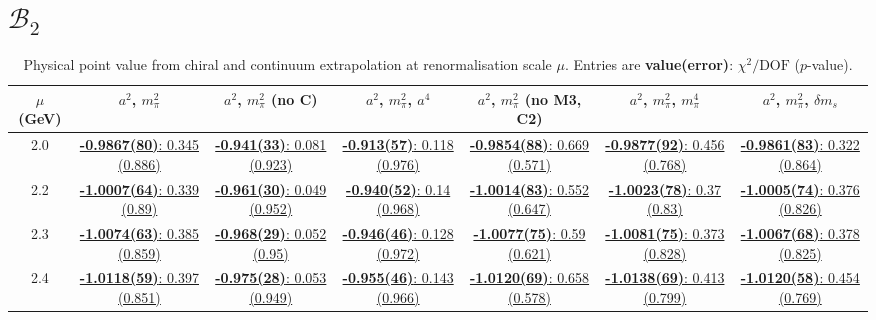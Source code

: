 \documentclass[12pt]{extarticle}
\begin{document}
\section{$\mathcal{B}_2$}
\begin{table}[h!]
\begin{center}
\begin{tabular}{|c|c|c|c|c|c|c|}
\hline
$\mu$ (GeV) & $a^2$, $m_\pi^2$& $a^2$, $m_\pi^2$ (no C)& $a^2$, $m_\pi^2$, $a^4$& $a^2$, $m_\pi^2$ (no M3, C2)& $a^2$, $m_\pi^2$, $m_\pi^4$& $a^2$, $m_\pi^2$, $\delta m_s$\\
\hline
2.0& \hyperlink{VVmAA/NPR/bag_a2m2_20.pdf.1}{\textbf{-0.9867(80)}: 0.345 (0.886)} & \hyperlink{VVmAA/NPR/bag_a2m2noC_20.pdf.1}{\textbf{-0.941(33)}: 0.081 (0.923)} & \hyperlink{VVmAA/NPR/bag_a2a4m2_20.pdf.1}{\textbf{-0.913(57)}: 0.118 (0.976)} & \hyperlink{VVmAA/NPR/bag_a2m2mcut_20.pdf.1}{\textbf{-0.9854(88)}: 0.669 (0.571)} & \hyperlink{VVmAA/NPR/bag_a2m2m4_20.pdf.1}{\textbf{-0.9877(92)}: 0.456 (0.768)} & \hyperlink{VVmAA/NPR/bag_a2m2delm_20.pdf.1}{\textbf{-0.9861(83)}: 0.322 (0.864)}\\
2.2& \hyperlink{VVmAA/NPR/bag_a2m2_22.pdf.1}{\textbf{-1.0007(64)}: 0.339 (0.89)} & \hyperlink{VVmAA/NPR/bag_a2m2noC_22.pdf.1}{\textbf{-0.961(30)}: 0.049 (0.952)} & \hyperlink{VVmAA/NPR/bag_a2a4m2_22.pdf.1}{\textbf{-0.940(52)}: 0.14 (0.968)} & \hyperlink{VVmAA/NPR/bag_a2m2mcut_22.pdf.1}{\textbf{-1.0014(83)}: 0.552 (0.647)} & \hyperlink{VVmAA/NPR/bag_a2m2m4_22.pdf.1}{\textbf{-1.0023(78)}: 0.37 (0.83)} & \hyperlink{VVmAA/NPR/bag_a2m2delm_22.pdf.1}{\textbf{-1.0005(74)}: 0.376 (0.826)}\\
2.3& \hyperlink{VVmAA/NPR/bag_a2m2_23.pdf.1}{\textbf{-1.0074(63)}: 0.385 (0.859)} & \hyperlink{VVmAA/NPR/bag_a2m2noC_23.pdf.1}{\textbf{-0.968(29)}: 0.052 (0.95)} & \hyperlink{VVmAA/NPR/bag_a2a4m2_23.pdf.1}{\textbf{-0.946(46)}: 0.128 (0.972)} & \hyperlink{VVmAA/NPR/bag_a2m2mcut_23.pdf.1}{\textbf{-1.0077(75)}: 0.59 (0.621)} & \hyperlink{VVmAA/NPR/bag_a2m2m4_23.pdf.1}{\textbf{-1.0081(75)}: 0.373 (0.828)} & \hyperlink{VVmAA/NPR/bag_a2m2delm_23.pdf.1}{\textbf{-1.0067(68)}: 0.378 (0.825)}\\
2.4& \hyperlink{VVmAA/NPR/bag_a2m2_24.pdf.1}{\textbf{-1.0118(59)}: 0.397 (0.851)} & \hyperlink{VVmAA/NPR/bag_a2m2noC_24.pdf.1}{\textbf{-0.975(28)}: 0.053 (0.949)} & \hyperlink{VVmAA/NPR/bag_a2a4m2_24.pdf.1}{\textbf{-0.955(46)}: 0.143 (0.966)} & \hyperlink{VVmAA/NPR/bag_a2m2mcut_24.pdf.1}{\textbf{-1.0120(69)}: 0.658 (0.578)} & \hyperlink{VVmAA/NPR/bag_a2m2m4_24.pdf.1}{\textbf{-1.0138(69)}: 0.413 (0.799)} & \hyperlink{VVmAA/NPR/bag_a2m2delm_24.pdf.1}{\textbf{-1.0120(58)}: 0.454 (0.769)}\\
\hline
\end{tabular}
\caption{Physical point value from chiral and continuum extrapolation at renormalisation scale $\mu$. Entries are \textbf{value(error)}: $\chi^2/\text{DOF}$ ($p$-value).}
\end{center}
\end{table}
\end{document}
